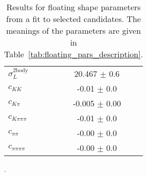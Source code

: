 \begin{table}[h]
\begin{tabular}{lc}
      $\sigma_L^\mathrm{2body}$ & 20.467 $\pm$ 0.6 \\
      $c_{KK}$ & -0.01 $\pm$ 0.0 \\
      $c_{K\pi}$ & -0.005 $\pm$ 0.00 \\
      $c_{K\pi\pi\pi}$ & -0.01 $\pm$ 0.0 \\
      $c_{\pi\pi}$ & -0.00 $\pm$ 0.0 \\
      $c_{\pi\pi\pi\pi}$ & -0.00 $\pm$ 0.0 \\
      \bottomrule
  \end{tabular}
  \caption{Results for floating shape parameters from a fit to selected candidates. The meanings of the parameters are given in Table~\ref{tab:floating_pars_description}.}.
\label{tab:floating_pars_shapes}
\end{table}
